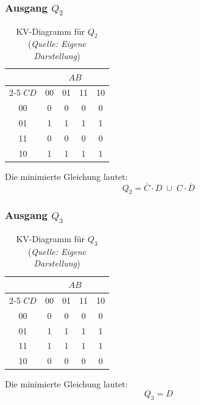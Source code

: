 \subsubsection{\texorpdfstring{Ausgang \(Q_2\)}{Ausgang Q2}}
\begin{table}[h]
\centering
\begin{tabular}{c|cccc}
\multicolumn{1}{c}{} & \multicolumn{4}{c}{\(AB\)} \\
\cline{2-5}
\(CD\) & 00 & 01 & 11 & 10 \\
\hline
00 & 0 & 0 & 0 & 0 \\
01 & 1 & 1 & 1 & 1 \\
11 & 0 & 0 & 0 & 0 \\
10 & 1 & 1 & 1 & 1 \\
\hline
\end{tabular}
\caption{KV-Diagramm für \(Q_2\) (\textit{Quelle: Eigene Darstellung})}
\end{table}
Die minimierte Gleichung lautet: \hspace{4cm} \[\boxed{Q_2 = \overline{C} \cdot D \;\cup\; C \cdot \overline{D}}\]
\subsubsection{\texorpdfstring{Ausgang \(Q_3\)}{Ausgang Q3}}
\begin{table}[h]
\centering
\begin{tabular}{c|cccc}
\multicolumn{1}{c}{} & \multicolumn{4}{c}{\(AB\)} \\
\cline{2-5}
\(CD\) & 00 & 01 & 11 & 10 \\
\hline
00 & 0 & 0 & 0 & 0 \\
01 & 1 & 1 & 1 & 1 \\
11 & 1 & 1 & 1 & 1 \\
10 & 0 & 0 & 0 & 0 \\
\hline
\end{tabular}
\caption{KV-Diagramm für \(Q_3\) (\textit{Quelle: Eigene Darstellung})}
\end{table}
Die minimierte Gleichung lautet: \hspace{4cm} \[\boxed{Q_3 = D}\]
